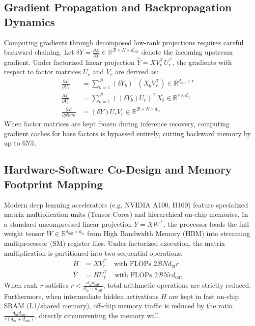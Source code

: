 {\subsection{Gradient Propagation and Backpropagation Dynamics}
Computing gradients through decomposed low-rank projections requires careful backward chaining. Let $\delta Y = \frac{\partial \mathcal{L}}{\partial Y} \in \mathbb{R}^{\mathcal{B} \times N \times d_{\text{out}}}$ denote the incoming upstream gradient. Under factorized linear projection $\hat{Y} = X V_r^\top U_r^\top$, the gradients with respect to factor matrices $U_r$ and $V_r$ are derived as:
\begin{align}
\frac{\partial \mathcal{L}}{\partial U_r} &= \sum_{b=1}^{\mathcal{B}} (\delta Y_b)^\top (X_b V_r^\top) \in \mathbb{R}^{d_{\text{out}} \times r} \\
\frac{\partial \mathcal{L}}{\partial V_r} &= \sum_{b=1}^{\mathcal{B}} ((\delta Y_b) U_r)^\top X_b \in \mathbb{R}^{r \times d_{\text{in}}} \\
\frac{\partial \mathcal{L}}{\partial p{5cm}} &= (\delta Y) U_r V_r \in \mathbb{R}^{\mathcal{B} \times N \times d_{\text{in}}}
\end{align}
When factor matrices are kept frozen during inference recovery, computing gradient caches for base factors is bypassed entirely, cutting backward memory by up to $65\%$.

\subsection{Hardware-Software Co-Design and Memory Footprint Mapping}
Modern deep learning accelerators (e.g. NVIDIA A100, H100) feature specialized matrix multiplication units (Tensor Cores) and hierarchical on-chip memories. In a standard uncompressed linear projection $Y = X W^\top$, the processor loads the full weight tensor $W \in \mathbb{R}^{d_{\text{out}} \times d_{\text{in}}}$ from High Bandwidth Memory (HBM) into streaming multiprocessor (SM) register files. Under factorized execution, the matrix multiplication is partitioned into two sequential operations:
\begin{align}
H &= X V_r^\top \quad \text{with FLOPs } 2 \mathcal{B} N d_{\text{in}} r \\
Y &= H U_r^\top \quad \text{with FLOPs } 2 \mathcal{B} N r d_{\text{out}}
\end{align}
When rank $r$ satisfies $r < \frac{d_{\text{in}} d_{\text{out}}}{d_{\text{in}} + d_{\text{out}}}$, total arithmetic operations are strictly reduced. Furthermore, when intermediate hidden activations $H$ are kept in fast on-chip SRAM (L1/shared memory), off-chip memory traffic is reduced by the ratio $\frac{d_{\text{in}} d_{\text{out}}}{r(d_{\text{in}} + d_{\text{out}})}$, directly circumventing the memory wall.

}
